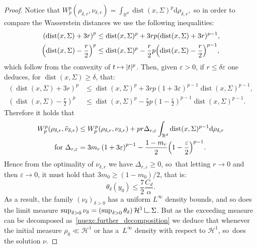 \documentclass[11pt]{article}
\numberwithin{equation}{section}
\newcommand\mto{\mathchoice{\longmapsto}{\mapsto}{\mapsto}{\mapsto}}
\theoremstyle{definition}
\newcommand\LM[1]{\hbox{\vrule width.5pt \vbox to#1pt{\vfill \hrule width#1pt height.5pt}}}
\newcommand\LL{{\mathchoice {\>\LM7\>}{\>\LM7\>}{\,\LM5\,}{\,\LM{3.35}\,}}}
\newcommand{\mres}{\LL}
\newcommand\cH{\mathcal{H}}
\newcommand{\RR}{\mathbb{R}}
\DeclareMathOperator{\dist}{dist}
\newcommand\dd{\mathrm{d}}
\begin{document}
\begin{proof}
Notice that
$
W_p^p(\rho_{\delta, r},\nu_{\delta, r})
=
\int_{\RR^d} \dist(x,\Sigma)^p\dd \rho_{\delta,r},
$
so in order to compare the Wasserstein distances we use the following inequalities:
\begin{align*}
\left(\dist(x,\Sigma) + 3r\right)^p
&\le
\dist(x,\Sigma)^p
+
3rp
(\dist(x,\Sigma)+3r)^{p-1}, \\
\left(\dist(x,\Sigma) -\frac{r}{2}\right)^p
&\le
\dist(x,\Sigma)^p
-
\frac{r}{2}p
\Bigl(\dist(x,\Sigma)-\frac{r}{2}\Bigr)^{p-1},
\end{align*}
which follow from the convexity of $t\mto |t|^p$.
Then, given $\varepsilon>0$, if $r\le \delta\varepsilon$ one deduces,
for $\dist(x,\Sigma)\ge \delta$, that:
\begin{align*}
\left(\dist(x,\Sigma) + 3r\right)^p
&\le
\dist(x,\Sigma)^p
+
3 r p(1+3\varepsilon)^{p-1}
\dist(x,\Sigma)^{p-1}, \\
\left(\dist(x,\Sigma) -\frac{r}{2}\right)^p
&\le
\dist(x,\Sigma)^p
-
\frac{r}{2}p \left(1-\frac{\varepsilon}{2}\right)^{p-1}
\dist(x,\Sigma)^{p-1}.
\end{align*}
Therefore it holds that
\begin{align*}
W_p^p(\rho_{\delta, r}, \tilde\nu_{\delta, r})
&\le
W_p^p(\rho_{\delta, r}, \nu_{\delta, r})
+
pr\Delta_{r,\varepsilon}
\int_{\RR^d}
\dist(x,\Sigma)^{p-1}\dd \rho_{\delta,r}\\
\text{ for }
\Delta_{r,\varepsilon}
&=
3m_{r}
\left(
1 + 3\varepsilon
\right)^{p-1}
-
\frac{1 - m_r}{2}
\Bigl(
1 - \frac{\varepsilon}{2}
\Bigr)^{p-1}.
\end{align*}
Hence from the optimality of $\nu_{\delta,r}$ we have $\Delta_{r,\varepsilon} \ge 0$, so~that letting $r \to 0$ and then $\varepsilon\to 0$, it must hold that
$3 m_0\ge (1-m_0)/2$, that is:
\[
\theta_\delta(y_0)
\le
\frac{7}{2}\frac{C_d}{\alpha}.
\]
As a result, the family $\left(\nu_\delta\right)_{\delta > 0}$ has a uniform $L^\infty$ density bounds, and so does the limit measure $\sup_{\delta > 0} \nu_\delta = \left(\sup_{\delta > 0}\theta_\delta\right)\cH^1\mres \Sigma$. But as the exceeding measure can be decomposed as~\eqref{nuexc.further_decomposition} we deduce that
whenever the initial measure $\rho_0 \ll \cH^1$ or has a~$L^{\infty}$ density with respect to $\cH^1$, so~does the solution $\nu$.
\end{proof}
\end{document}
